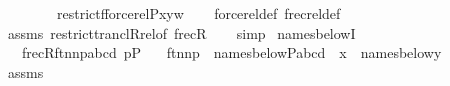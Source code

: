 \begin{isabellebody}
\ \ \ \ \ \ \ {\isacharequal}{\kern0pt}\ restrict{\isacharparenleft}{\kern0pt}f{\isacharcomma}{\kern0pt}forcerel{\isacharparenleft}{\kern0pt}P{\isacharcomma}{\kern0pt}x{\isacharparenright}{\kern0pt}{\isacharminus}{\kern0pt}{\isacharbackquote}{\kern0pt}{\isacharbackquote}{\kern0pt}{\isacharbraceleft}{\kern0pt}y{\isacharbraceright}{\kern0pt}{\isacharparenright}{\kern0pt}{\isacharbackquote}{\kern0pt}w{\isachardoublequoteclose}\isanewline
%
\isadelimproof
\ \ %
\endisadelimproof
%
\isatagproof
{}\isamarkupfalse%
\ forcerel{\isacharunderscore}{\kern0pt}def\ frecrel{\isacharunderscore}{\kern0pt}def\ \isamarkupfalse%
\ assms\ restrict{\isacharunderscore}{\kern0pt}trancl{\isacharunderscore}{\kern0pt}Rrel{\isacharbrackleft}{\kern0pt}of\ frecR{\isacharbrackright}{\kern0pt}\isanewline
\ \ \isamarkupfalse%
\ simp%
\endisatagproof
{\isafoldproof}%
%
\isadelimproof
\isanewline
%
\endisadelimproof
\isanewline
{}\isamarkupfalse%
\ names{\isacharunderscore}{\kern0pt}belowI\ {\isacharcolon}{\kern0pt}\isanewline
\ \ \ {\isachardoublequoteopen}frecR{\isacharparenleft}{\kern0pt}{\isasymlangle}ft{\isacharcomma}{\kern0pt}n{}{\isacharcomma}{\kern0pt}n{}{\isacharcomma}{\kern0pt}p{\isasymrangle}{\isacharcomma}{\kern0pt}{\isasymlangle}a{\isacharcomma}{\kern0pt}b{\isacharcomma}{\kern0pt}c{\isacharcomma}{\kern0pt}d{\isasymrangle}{\isacharparenright}{\kern0pt}{\isachardoublequoteclose}\ {\isachardoublequoteopen}p{\isasymin}P{\isachardoublequoteclose}\isanewline
\ \ \ {\isachardoublequoteopen}{\isasymlangle}ft{\isacharcomma}{\kern0pt}n{}{\isacharcomma}{\kern0pt}n{}{\isacharcomma}{\kern0pt}p{\isasymrangle}\ {\isasymin}\ names{\isacharunderscore}{\kern0pt}below{\isacharparenleft}{\kern0pt}P{\isacharcomma}{\kern0pt}{\isasymlangle}a{\isacharcomma}{\kern0pt}b{\isacharcomma}{\kern0pt}c{\isacharcomma}{\kern0pt}d{\isasymrangle}{\isacharparenright}{\kern0pt}{\isachardoublequoteclose}\ {\isacharparenleft}{\kern0pt}\ {\isachardoublequoteopen}{\isacharquery}{\kern0pt}x\ {\isasymin}\ names{\isacharunderscore}{\kern0pt}below{\isacharparenleft}{\kern0pt}{\isacharunderscore}{\kern0pt}{\isacharcomma}{\kern0pt}{\isacharquery}{\kern0pt}y{\isacharparenright}{\kern0pt}{\isachardoublequoteclose}{\isacharparenright}{\kern0pt}\isanewline
%
\isadelimproof
%
\endisadelimproof
%
\isatagproof
{}\isamarkupfalse%
\ {\isacharminus}{\kern0pt}\isanewline
\ \ \isamarkupfalse%
\ assms\isanewline
\ \ \isamarkupfalse%

\end{isabellebody}
